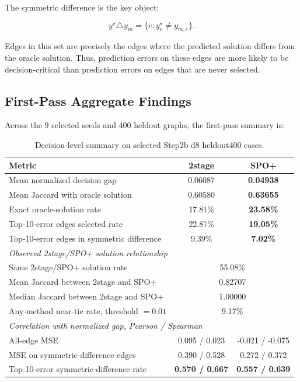 \documentclass[11pt]{article}
\begin{document}
The symmetric difference is the key object:

\[
y^\star \triangle y_m
=
\{e: y^\star_e \neq y_{m,e}\}.
\]

Edges in this set are precisely the edges where the predicted solution differs
from the oracle solution. Thus, prediction errors on these edges are more
likely to be decision-critical than prediction errors on edges that are never
selected.

\subsection{First-Pass Aggregate Findings}
Across the 9 selected seeds and 400 heldout graphs, the first-pass summary is:

\begin{table}[H]
\centering
\small
\caption{Decision-level summary on selected Step2b d8 heldout400 cases.}
\label{tab:decision-analysis-summary}
\begin{tabular}{lcc}
\toprule
Metric & 2stage & SPO+ \\
\midrule
Mean normalized decision gap & 0.06087 & \textbf{0.04938} \\
Mean Jaccard with oracle solution & 0.60580 & \textbf{0.63655} \\
Exact oracle-solution rate & 17.81\% & \textbf{23.58\%} \\
Top-10-error edges selected rate & 22.87\% & \textbf{19.05\%} \\
Top-10-error edges in symmetric difference & 9.39\% & \textbf{7.02\%} \\
\midrule
\multicolumn{3}{l}{\textit{Observed 2stage/SPO+ solution relationship}} \\
Same 2stage/SPO+ solution rate & \multicolumn{2}{c}{55.08\%} \\
Mean Jaccard between 2stage and SPO+ & \multicolumn{2}{c}{0.82707} \\
Median Jaccard between 2stage and SPO+ & \multicolumn{2}{c}{1.00000} \\
Any-method near-tie rate, threshold $=0.01$ & \multicolumn{2}{c}{9.17\%} \\
\midrule
\multicolumn{3}{l}{\textit{Correlation with normalized gap, Pearson / Spearman}} \\
All-edge MSE & 0.095 / 0.023 & -0.021 / -0.075 \\
MSE on symmetric-difference edges & 0.390 / 0.528 & 0.272 / 0.372 \\
Top-10-error symmetric-difference rate & \textbf{0.570 / 0.667} & \textbf{0.557 / 0.639} \\
\bottomrule
\end{tabular}
\end{table}
\end{document}
